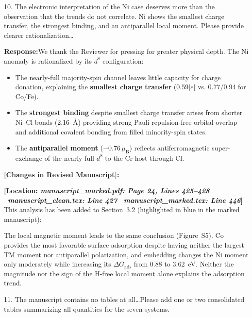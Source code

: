 \documentclass[11pt, sans, a4paper]{moderncv}
\newcommand{\response}{\vspace{0.4em}\noindent\textbf{\color{actionblue}Response:}\hspace{0.5em}}
\newcommand{\manuscriptchange}[1]{\vspace{0.4em}\noindent\textbf{\color{acsblue}[Changes in Revised Manuscript]:}\par\nopagebreak\vspace{0.15em}#1\vspace{0.4em}}
\begin{document}
\vspace{0.8em}

\begin{reviewercomment}
10. The electronic interpretation of the Ni case deserves more than the observation that the trends do not correlate. Ni shows the smallest charge transfer, the strongest binding, and an antiparallel local moment. Please provide clearer rationalization\ldots
\end{reviewercomment}

\response We thank the Reviewer for pressing for greater physical depth. The Ni anomaly is rationalized by its $d^8$ configuration:
\begin{itemize}[leftmargin=1.5em, itemsep=0.2em]
\item The nearly-full majority-spin channel leaves little capacity for charge donation, explaining the \textbf{smallest charge transfer} (0.59$|e|$ vs. 0.77/0.94 for Co/Fe).
\item The \textbf{strongest binding} despite smallest charge transfer arises from shorter Ni--Cl bonds (2.16~\AA) providing strong Pauli-repulsion-free orbital overlap and additional covalent bonding from filled minority-spin states.
\item The \textbf{antiparallel moment} ($-0.76\,\mu_{\mathrm{B}}$) reflects antiferromagnetic super-exchange of the nearly-full $d^8$ to the Cr host through Cl.
\end{itemize}

\manuscriptchange{\textbf{[Location: \textit{manuscript\_marked.pdf: Page 24, Lines 425--428} \textbar\ \textit{manuscript\_clean.tex: Line 427} \textbar\ \textit{manuscript\_marked.tex: Line 446}]}\\ This analysis has been added to Section~3.2 (highlighted in blue in the marked manuscript):}
\begin{addedtext}
The local magnetic moment leads to the same conclusion (Figure~S5). Co provides the most favorable surface adsorption despite having neither the largest TM moment nor antiparallel polarization, and embedding changes the Ni moment only moderately while increasing its $\Delta G_{\mathrm{ads}}$ from 0.88 to 3.62~eV. Neither the magnitude nor the sign of the H-free local moment alone explains the adsorption trend.
\end{addedtext}

\vspace{0.8em}

\begin{reviewercomment}
11. The manuscript contains no tables at all\ldots Please add one or two consolidated tables summarizing all quantities for the seven systems.
\end{reviewercomment}
\end{document}
